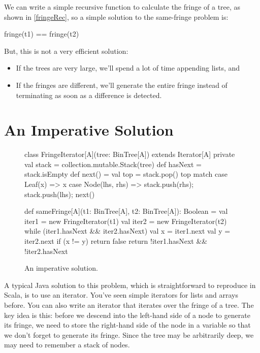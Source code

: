 \documentclass[9pt]{extbook}
\begin{document}
We can write a simple recursive function to calculate the fringe of a tree,
as shown in \cref{fringeRec}, so a simple solution to the same-fringe problem
is:
\begin{scalacode}
fringe(t1) == fringe(t2)
\end{scalacode}

But, this is not a very efficient solution:
\begin{itemize}

  \item If the trees are very large, we'll spend a lot of time appending
  lists, and

  \item If the fringes are different, we'll generate the entire fringe instead
  of terminating as soon as a difference is detected.

\end{itemize}

\section{An Imperative Solution}

\begin{figure}
\begin{scalacode}
class FringeIterator[A](tree: BinTree[A]) extends Iterator[A] {
  private val stack = collection.mutable.Stack(tree)
  def hasNext = stack.isEmpty
  def next() = {
    val top = stack.pop()
    top match {
      case Leaf(x) => x
      case Node(lhs, rhs) => { stack.push(rhs); stack.push(lhs); next() }
    }
  }
}

def sameFringe[A](t1: BinTree[A], t2: BinTree[A]): Boolean = {
  val iter1 = new FringeIterator(t1)
  val iter2 = new FringeIterator(t2)
  while (iter1.hasNext && iter2.hasNext) {
    val x = iter1.next
    val y = iter2.next
    if (x != y) {
      return false
    }
  }
  return !iter1.hasNext && !iter2.hasNext
}
\end{scalacode}
\caption{An imperative solution.}
\label{samefringe_imperative}
\end{figure}

A typical Java solution to this problem, which is straightforward to
reproduce in Scala, is to use an iterator. You've seen simple
iterators for lists and arrays before.  You can also write an iterator
that iterates over the fringe of a tree.  The key idea is this:
before we descend into the left-hand side of a node to generate its
fringe, we need to store the right-hand side of the node in a variable so that
we don't forget to generate its fringe. Since the tree may be arbitrarily deep, we
may need to remember a stack of nodes.
\end{document}
